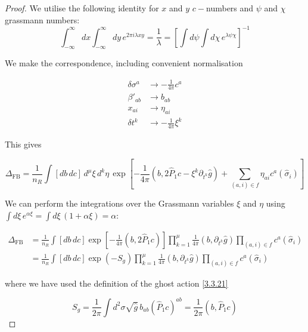 \begin{tcolorbox}[breakable]
	\begin{proof}
		We utilise the following identity for $x$ and $y$ $c-$numbers and $\psi$ and $\chi$ grassmann numbers:
		\begin{equation}
			\int_{-\infty}^{\infty} dx \int_{-\infty}^{\infty} dy \, e^{2\pi i \lambda xy} = \frac{1}{\lambda} = \left[ \int d\psi \int d\chi \, e^{\lambda \psi \chi} \right]^{-1}
		\end{equation}
		
		We make the correspondence, including convenient normalisation
		
		\begin{align}
			\delta \sigma^a &\to -\frac{1}{4\pi} c^a \nonumber \\
			\beta'_{ab} &\to b_{ab} \nonumber \\
			x_{ai} &\to \eta_{ai} \nonumber \\
			\delta t^k &\to -\frac{1}{4\pi} \xi^k
		\end{align}
		
		This gives
		
		\begin{equation}
			\Delta_{\text{FB}} = \frac{1}{n_R} \int [db \, dc] \, d^\mu\xi \, d^k \eta \, \exp \left[ -\frac{1}{4\pi} (b, 2\hat{P}_1 c - \xi^k \partial_{t^k} \hat{g}) + \sum_{(a,i) \in f} \eta_{ai} c^a (\hat{\sigma}_i) \right]
		\end{equation}
		
		We can perform the integrations over the Grassmann variables $\xi$ and $\eta$ using $\int d\xi \, e^{\alpha \xi} = \int d\xi \, (1 + \alpha \xi) = \alpha$:
		
		\begin{align}
			\Delta_{\text{FB}} &= \frac{1}{n_R} \int [db \, dc] \exp \left[ -\frac{1}{4\pi} (b, 2\hat{P}_1 c) \right] \prod_{k=1}^\mu \frac{1}{4\pi} (b, \partial_{t^k} \hat{g}) \prod_{(a,i) \in f} c^a (\hat{\sigma}_i) \nonumber \\
			&= \frac{1}{n_R} \int [db \, dc] \exp(-S_g) \prod_{k=1}^\mu \frac{1}{4\pi} (b, \partial_{t^k} \hat{g}) \prod_{(a,i) \in f} c^a (\hat{\sigma}_i)
		\end{align}
		
		where we have used the definition of the ghost action \eqref{3.3.21}
		
		\begin{equation}
			S_g = \frac{1}{2\pi} \int d^2 \sigma \sqrt{\hat{g}} \, b_{ab} (\hat{P}_1 c)^{ab} = \frac{1}{2\pi} (b, \hat{P}_1 c)
		\end{equation}
	\end{proof}
\end{tcolorbox}

